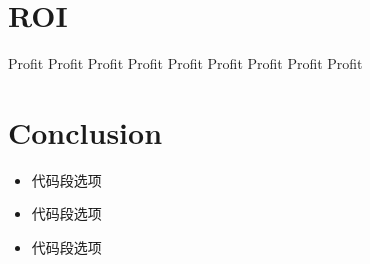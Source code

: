 \documentclass[]{tufte-handout}
\providecommand{\tightlist}{%
  \setlength{\itemsep}{0pt}\setlength{\parskip}{0pt}}
\begin{document}
\hypertarget{roi}{%
\section{ROI}\label{roi}}

Profit Profit Profit Profit Profit Profit Profit Profit Profit

\hypertarget{conclusion}{%
\section{Conclusion}\label{conclusion}}

\begin{itemize}
\tightlist
\item
  代码段选项
\item
  代码段选项
\item
  代码段选项
\end{itemize}


\end{document}
